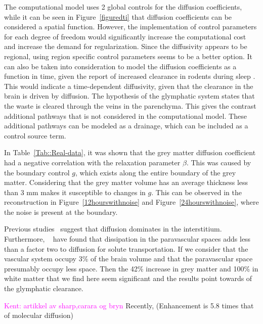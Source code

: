 \documentclass[12pt,a4paper]{article}
\newcommand{\lars}[1]{\textcolor{magenta}{#1}}
\begin{document}
The computational model uses 2 global controls for the diffusion coefficients, while it can be seen in  Figure~\ref{figuredti} that diffusion coefficients can be considered a spatial function. However, the implementation of control parameters for each degree of freedom would significantly increase the computational cost and increase the demand for regularization. Since the diffusivity appears to be regional, using region specific control parameters seems to be a better option.
It can also be taken into consideration to model the diffusion coefficients as a function in time, given the report of increased clearance in rodents during sleep \cite{xie2013sleep}. This would indicate a time-dependent diffusivity, given that the clearance in the brain is driven by diffusion. %
The hypothesis of the glymphatic system \cite{iliff2012paravascular} states that the waste is cleared through the veins in the parenchyma. This gives the contrast additional pathways that is not considered in the computational model. These additional pathways can be modeled as a drainage, which can be included as a control source term. 

In Table~\ref{Tab::Real-data}, it was shown that the grey matter diffusion coefficient had a negative correlation with the relaxation parameter $\beta$. This was caused by the boundary control $g$, which exists along the entire boundary of the grey matter. Considering that the grey matter volume has an average thickness less than 3 mm makes it susceptible to changes in $g$. This can be observed in the reconstruction in Figure~\ref{12hourswithnoise} and Figure~\ref{24hourswithnoise}, where the noise is present at the boundary.
  
Previous studies~\cite{holter2017interstitial, smith2017glymphatic} suggest that diffusion dominates in the interstitium. Furthermore, ~\cite{asgari2016glymphatic, brynjfm, Diem} have found that dissipation in the paravascular spaces adds less than a factor two
to diffusion for solute transportation. If we consider that the vascular system occupy 3\% of the brain volume
and that the paravascular space presumably occupy less space. Then the 42\% increase in grey matter and 100\% in white matter that we find here seem significant and the results point towards of the glymphatic clearance.  

\lars{Kent: artikkel av sharp,carara og bryn} 
Recently,   \cite{sharp2019dispersion} (Enhancement is 5.8 times that of molecular diffusion)
\end{document}
